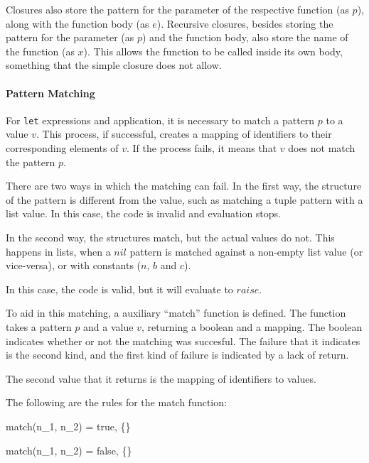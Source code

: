 \documentclass{article}
\begin{document}
Closures also store the pattern for the parameter of the respective function (as $p$), along with the function body (as $e$).
Recursive closures, besides storing the pattern for the parameter (as $p$) and the function body, also store the name of the function (as $x$).
This allows the function to be called inside its own body, something that the simple closure does not allow.

\paragraph{Pattern Matching}

For \texttt{let} expressions and application, it is necessary to match a pattern $p$ to a value $v$.
This process, if successful, creates a mapping of identifiers to their corresponding elements of $v$.
If the process fails, it means that $v$ does not match the pattern $p$.

There are two ways in which the matching can fail.
In the first way, the structure of the pattern is different from the value, such as matching a tuple pattern with a list value.
In this case, the code is invalid and evaluation stops.

In the second way, the structures match, but the actual values do not.
This happens in lists, when a $nil$ pattern is matched against a non-empty list value (or vice-versa), or with constants ($n$, $b$ and $c$).

In this case, the code is valid, but it will evaluate to $raise$.

\medskip

To aid in this matching, a auxiliary ``match'' function is defined.
The function takes a pattern $p$ and a value $v$, returning a boolean and a mapping.
The boolean indicates whether or not the matching was succesful.
The failure that it indicates is the second kind, and the first kind of failure is indicated by a lack of return.

The second value that it returns is the mapping of identifiers to values.

The following are the rules for the match function:



    {match(n_1, n_2) = true, \{\}}

    {match(n_1, n_2) = false, \{\}}
\end{document}
